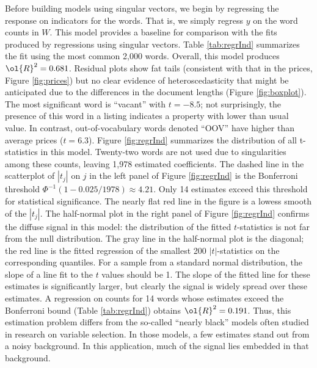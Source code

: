 \documentclass[12pt]{article}
\begin{document}
Before building models using singular vectors, we begin by regressing the response on indicators for the words.  That is, we simply regress $y$ on the word counts in $W$.  This model provides a baseline for comparison with the fits produced by regressions using singular vectors.  Table \ref{tab:regrInd} summarizes the fit using the most common 2,000 words.  Overall, this model produces $\ol{R}^2 = 0.681$.  Residual plots show fat tails (consistent with that in the prices, Figure \ref{fig:prices}) but no clear evidence of heteroscedasticity that might be anticipated due to the differences in the document lengths (Figure \ref{fig:boxplot}).  The most significant word is ``vacant'' with $t=-8.5$; not surprisingly, the presence of this word in a listing indicates a property with lower than usual value.  In contrast, out-of-vocabulary words denoted ``OOV'' have higher than average prices ($t=6.3$). Figure \ref{fig:regrInd} summarizes the distribution of all t-statistics in this model.  Twenty-two words are not used due to singularities among these counts, leaving 1,978 estimated coefficients.  The dashed line in the scatterplot of $|t_j|$ on $j$ in the left panel of Figure \ref{fig:regrInd} is the Bonferroni threshold $\Phi^{-1}(1-0.025/1978) \approx 4.21$.  Only 14 estimates exceed this threshold for statistical significance.  The nearly flat red line in the figure is a lowess smooth of the $|t_j|$.  The half-normal plot in the right panel of Figure \ref{fig:regrInd} confirms the diffuse signal in this model: the distribution of the fitted $t$-statistics is not far from the null distribution.  The gray line in the half-normal plot is the diagonal; the red line is the fitted regression of the smallest 200  $|t|$-statistics on the corresponding quantiles.  For a sample from a standard normal distribution, the slope of a line fit to the $t$ values should be 1.  The slope of the fitted line for these estimates is significantly larger, but clearly the signal is widely spread over these estimates.  A regression on counts for 14 words whose estimates exceed the Bonferroni bound (Table \ref{tab:regrInd}) obtains $\ol{R}^2 = 0.191$.  Thus, this estimation problem differs from the so-called ``nearly black'' models often studied in research on variable selection.  In those models, a few estimates stand out from a noisy background. In this application, much of the signal lies embedded in that background.
\end{document}
